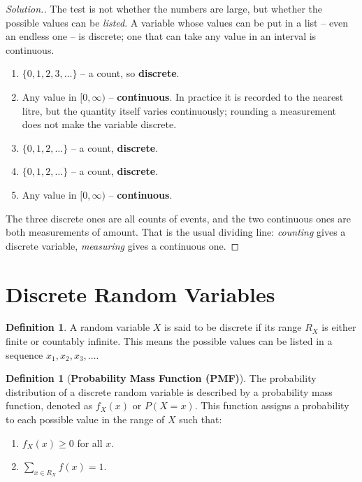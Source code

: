 \documentclass[12pt,a4paper]{report}
\theoremstyle{definition}
\newtheorem{definition}[thm]{Definition}
\theoremstyle{plain}
\theoremstyle{definition}
\newenvironment{solution}
  {\renewcommand{\qedsymbol}{}\begin{proof}[\textit{Solution}.]}
  {\end{proof}}
\begin{document}
\begin{solution}
The test is not whether the numbers are large, but whether the possible values can be
\emph{listed}. A variable whose values can be put in a list -- even an endless one -- is
discrete; one that can take any value in an interval is continuous.
\begin{enumerate}
\item[(a).] $\{0,1,2,3,\ldots\}$ -- a count, so \textbf{discrete}.
\item[(b).] Any value in $[0,\infty)$ -- \textbf{continuous}. In practice it is recorded to
the nearest litre, but the quantity itself varies continuously; rounding a measurement
does not make the variable discrete.
\item[(c).] $\{0,1,2,\ldots\}$ -- a count, \textbf{discrete}.
\item[(d).] $\{0,1,2,\ldots\}$ -- a count, \textbf{discrete}.
\item[(e).] Any value in $[0,\infty)$ -- \textbf{continuous}.
\end{enumerate}
The three discrete ones are all counts of events, and the two continuous ones are both
measurements of amount. That is the usual dividing line: \emph{counting} gives a discrete
variable, \emph{measuring} gives a continuous one.
\end{solution}

\section{Discrete Random Variables}
\begin{definition}
A random variable $X$ is said to be discrete if its range $R_X$ is either finite or countably infinite. This means the possible values can be listed in a sequence $x_1, x_2, x_3, \dots$.
\end{definition}


\begin{definition}[\textbf{Probability Mass Function (PMF)}]
The probability distribution of a discrete random variable is described by a probability mass function, denoted as $f_X(x)$ or $P(X=x)$. This function assigns a probability to each possible value in the range of $X$ such that:
\begin{enumerate}
\item $f_X(x) \geq 0$ for all $x$.
\item $\sum_{x \in R_X} f(x) = 1$.
\end{enumerate}
\end{definition}
\end{document}
